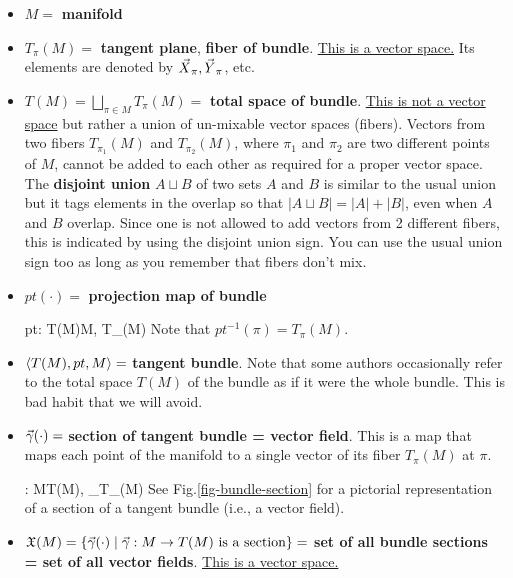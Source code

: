 \begin{itemize}

\item $M=$ {\bf manifold}

\item $T_\pi(M)=$ {\bf tangent plane}, {\bf fiber
of bundle}. \ul{This is a vector space.}
Its elements are denoted by ${\vec{X}}_\pi,
{\vec{Y}}_\pi$, etc.


\item $T(M)=  \bigsqcup_{\pi\in M}T_\pi(M)=$ 
{\bf total space of bundle}. \ul{This is not a vector space} but rather a union
of un-mixable vector spaces (fibers).
Vectors 
from two fibers $T_{\pi_1}(M)$
and $T_{\pi_2}(M)$,  where $\pi_1$
and $\pi_2$
are two different points of $M$, cannot be added to each other as required for a proper vector space. 
The {\bf disjoint union} 
$A\sqcup B$ of two sets $A$ and $B$ is similar to the usual union but it tags elements in the overlap so that $|A\sqcup B|=|A| + |B|$, even when $A$ and $B$ overlap. Since one
is not allowed to add vectors
from 2 different fibers, this is indicated by
using the disjoint union sign. 
You can use the usual union sign too
as long as you remember that
fibers 
don't mix.


\item $pt(\cdot)=$ {\bf projection map of
bundle}

\beq
 pt: T(M)\rarrow M, \quad T_\pi(M)\mapsto \pi
\eeq
Note that  $pt^{-1}(\pi)= T_\pi(M)$.

\item $\left\langle T(M), pt, M\right\rangle=$ {\bf tangent bundle}. Note that some authors
occasionally refer to the total 
space $T(M)$ of the bundle  as if it were the whole bundle.
This is bad habit
that we will avoid. 

\item ${\vec{\gamma}}(\cdot)=$ {\bf section of tangent bundle = vector field}. This 
is a map that maps each point
of the manifold to a single vector
of its fiber $T_\pi(M)$ at $\pi$.

\beq
\vgamma: M\rarrow T(M), \quad \pi\mapsto \vecX_\pi\in T_\pi(M)
\eeq
See Fig.\ref{fig-bundle-section} 
for a pictorial representation of a section of a tangent bundle (i.e., a vector field).
\item $\mathfrak{X}(M)=\{ {\vec{\gamma}}(\cdot)\mid   {\vec{\gamma}}: M \rightarrow T(M)\text{ is a section}\} =$ {\bf set of all bundle sections = set of all vector fields}. \ul{This is a vector space.}

\end{itemize}

